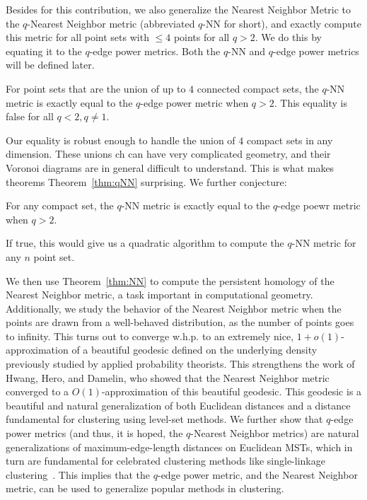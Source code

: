 Besides for this contribution, we also generalize the Nearest Neighbor
Metric to the $q$-Nearest Neighbor metric (abbreviated $q$-NN for short),
and exactly compute this metric for all point sets with $\leq 4$ points for all $q>2$. We
do this by equating it to the $q$-edge power metrics. Both the $q$-NN and
$q$-edge power metrics will be defined later.
\begin{theorem} \label{thm:qNN}
For point sets that are the union of up to $4$ connected compact sets, the $q$-NN metric is exactly equal to
the $q$-edge power metric when $q>2$. This equality is false for all $q <
2, q\not=1$.
\end{theorem}
Our equality is robust enough to handle the union of $4$ compact sets in
any dimension. These unions
ch can have very complicated geometry, and their Voronoi diagrams are in
general difficult to understand. This is what makes theorems
Theorem~\ref{thm:qNN} surprising. We further conjecture:
\begin{conjecture}\label{conj:qNN}
For any compact set, the $q$-NN metric is exactly equal to the $q$-edge
poewr metric when $q>2$.
\end{conjecture}
If true, this would give us a quadratic algorithm to compute the $q$-NN
metric for any $n$ point set.

 We then use Theorem~\ref{thm:NN} to compute the persistent homology
of the Nearest Neighbor metric, a task important in computational geometry.
Additionally, we study the behavior of the Nearest Neighbor metric when the
points are drawn from a well-behaved distribution, as the number of points
goes to infinity. This turns out to converge w.h.p. to an extremely nice,
$1+o(1)$-approximation of a beautiful geodesic defined on the underlying
density previously studied by applied probability theorists. This
strengthens the work of Hwang, Hero, and Damelin, who showed that the
Nearest Neighbor metric converged to a $O(1)$-approximation of this
beautiful geodesic. This geodesic is a beautiful and natural generalization
of both Euclidean distances and a distance fundamental for clustering using
level-set methods. We further show that $q$-edge power metrics (and thus,
it is hoped, the $q$-Nearest Neighbor metrics) are natural generalizations
of maximum-edge-length distances on Euclidean MSTs, which in turn are
fundamental for celebrated clustering methods like single-linkage
clustering~\cite{}. This implies that the $q$-edge power metric, and the
Nearest Neighbor metric, can be used to generalize popular methods in
clustering.
